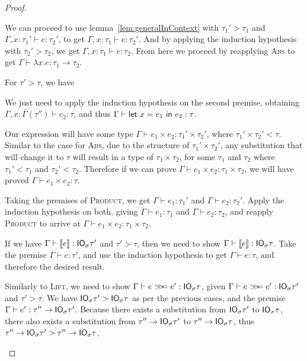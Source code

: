 \begin{proof}
\begin{description}
    We can proceed to use lemma~\ref{lem:generalInContext} with
    $\tau_1' > \tau_1$ and $\Gamma,x : \tau_1' \vdash e : \tau_2'$, to get
    $\Gamma, x : \tau_1 \vdash e : \tau_2'$.  And by applying the induction hypothesis
    with $\tau_2' > \tau_2$, we get $\Gamma, x : \tau_1 \vdash e : \tau_2$. From here we
    proceed by reapplying \textsc{Abs} to get $\Gamma \vdash \lambda x . e : \tau_1 \rightarrow
    \tau_2$.
  \item[\textmd{\boxed{\textsc{Let}}}]
    For $\tau' > \tau$, we have
    \begin{mathpar}
    \end{mathpar}
    We just need to apply the induction hypothesis on the second
    premise, obtaining
    $\Gamma, x : \bar{\Gamma}(\tau'') \vdash e_2 : \tau$, and thus
    $\Gamma \vdash \letin{x = e_1}{e_2} : \tau$.
  \item[\textmd{\boxed{\textsc{Product}}}]
    Our expression will have some type $\Gamma \vdash e_1 \times e_2 : \tau_1' \times \tau_2'$, where $\tau_1' \times
    \tau_2' < \tau$. Similar to the case for \textsc{Abs}, due to the
    structure of $\tau_1' \times \tau_2'$, any substitution that will change it
    to $\tau$ will result in a type of $\tau_1 \times \tau_2$, for some $\tau_1$ and
    $\tau_2$ where $\tau_1' < \tau_1$ and $\tau_2' < \tau_2$. 
    Therefore if we can prove $\Gamma \vdash e_1 \times e_2 : \tau_1 \times \tau_2$, we will
    have proved $\Gamma \vdash e_1 \times e_2 : \tau$.
    
    Taking the premises of \textsc{Product}, we get $\Gamma \vdash e_1 : \tau_1'$
    and $\Gamma \vdash e_2 : \tau_2'$. Apply the induction hypothesis on both, giving
    $\Gamma \vdash e_1 : \tau_1$ and $\Gamma \vdash e_2 : \tau_2$, and reapply \textsc{Product} to
    arrive at $\Gamma \vdash e_1 \times e_2 : \tau_1 \times \tau_2$.
  \item[\textmd{\boxed{\textsc{Lift}}}]
    If we have $\Gamma \vdash \lift{e} : \IO_\sigma \tau'$ and $\tau' > \tau$, then we need to
    show $\Gamma \vdash \lift{e} : \IO_\sigma \tau$. Take the premise $\Gamma \vdash e : \tau'$,
    and use the induction hypothesis to get $\Gamma \vdash e : \tau$, and therefore
    the desired result.
  \item[\textmd{\boxed{\textsc{Bind}}}]
    Similarly to \textsc{Lift}, we need to show $\Gamma \vdash e \bind e' :
    \IO_\sigma \tau$, given $\Gamma \vdash e \bind e' : \IO_\sigma \tau'$ and $\tau' > \tau$.
    We have $\IO_\sigma \tau' > \IO_\sigma \tau$ as per the previous cases, and the
    premise $\Gamma \vdash e' : \tau'' \rightarrow \IO_\sigma \tau'$. Because there exists a
    substitution from $\IO_\sigma \tau'$ to $\IO_\sigma \tau$, there also exists a
    substitution from $\tau'' \rightarrow \IO_\sigma \tau'$ to $\tau'' \rightarrow \IO_\sigma \tau$, thus
    $\tau'' \rightarrow \IO_\sigma \tau' > \tau'' \rightarrow \IO_\sigma \tau$.


\end{description}
\end{proof}
